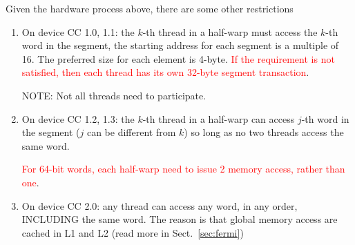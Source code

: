 Given the hardware process above, there are some other restrictions
\begin{enumerate}
\item On device CC 1.0, 1.1: the $k$-th thread in a half-warp must
  access the $k$-th word in the segment, the starting address for each
  segment is a multiple of 16. The preferred size for each element is
  4-byte.
  \textcolor{red}{If the requirement is not satisfied, then each
    thread has its own 32-byte segment transaction}.

  NOTE: Not all threads need to participate. 

\item On device CC 1.2, 1.3: the $k$-th thread in a half-warp can
  access $j$-th word in the segment ($j$ can be different from $k$) so
  long as no two threads access the same word. %

  \textcolor{red}{For 64-bit words, each half-warp need to issue 2
    memory access, rather than one}.  %

\item On device CC 2.0: any thread can access any word, in any order,
  INCLUDING the same word. The reason is that global memory access are
  cached in L1 and L2 (read more in Sect.~\ref{sec:fermi})

\end{enumerate}

